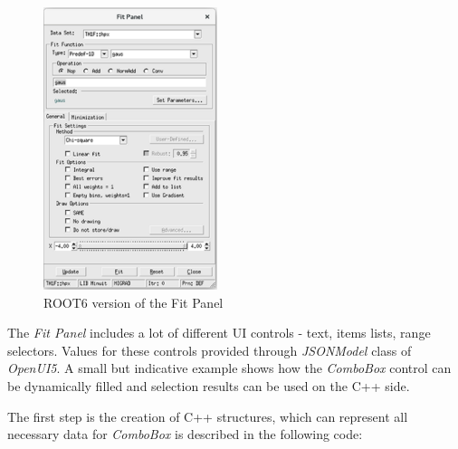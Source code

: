 \documentclass[a4paper]{jpconf}
\begin{document}
\begin{figure}[h]
\begin{minipage}{14pc}
\includegraphics[width=12pc]{oldPanel.eps}
\caption{\label{label}ROOT6 version of the Fit Panel}
\end{minipage}
\end{figure}

The \textit{Fit Panel} includes a lot of different UI controls - text, items lists, range selectors.
Values for these controls provided through \textit{JSONModel} class of \textit{OpenUI5}.
A small but indicative example shows how the \textit{ComboBox} control can be dynamically filled and selection results can be used on the C++ side.

The first step is the creation of C++ structures, which can represent all necessary data for \textit{ComboBox} is described in the following code:
\end{document}
